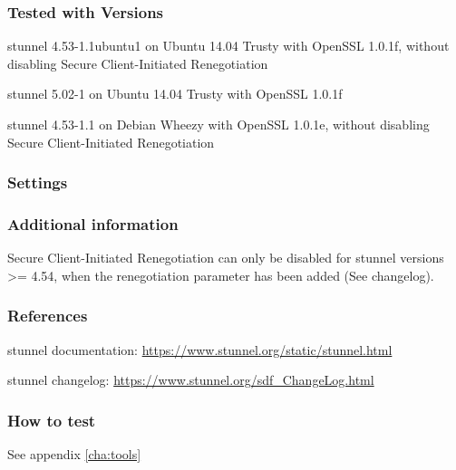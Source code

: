 \subsubsection{Tested with Versions}
\begin{itemize*}
  \item stunnel 4.53-1.1ubuntu1 on Ubuntu 14.04 Trusty with OpenSSL 1.0.1f, without disabling Secure Client-Initiated Renegotiation
  \item stunnel 5.02-1 on Ubuntu 14.04 Trusty with OpenSSL 1.0.1f
  \item stunnel 4.53-1.1 on Debian Wheezy with OpenSSL 1.0.1e, without disabling Secure Client-Initiated Renegotiation
\end{itemize*}

\subsubsection{Settings}

\subsubsection{Additional information}
Secure Client-Initiated Renegotiation can only be disabled for stunnel versions >= 4.54, when the renegotiation parameter has been added (See changelog).

\subsubsection{References} 
\begin{itemize*}
  \item stunnel documentation: \url{https://www.stunnel.org/static/stunnel.html}
  \item stunnel changelog: \url{https://www.stunnel.org/sdf_ChangeLog.html}
\end{itemize*}


\subsubsection{How to test} 
See appendix \ref{cha:tools}

